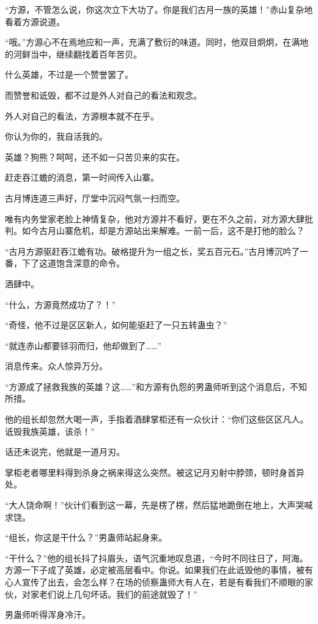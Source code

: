 \begin{this_body}
“方源，不管怎么说，你这次立下大功了。你是我们古月一族的英雄！”赤山复杂地看着方源说道。

“哦。”方源心不在焉地应和一声，充满了敷衍的味道。同时，他双目炯炯，在满地的河鲜当中，继续翻找着百年苦贝。

什么英雄，不过是一个赞誉罢了。

而赞誉和诋毁，都不过是外人对自己的看法和观念。

外人对自己的看法，方源根本就不在乎。

你认为你的，我自活我的。

英雄？狗熊？呵呵，还不如一只苦贝来的实在。

赶走吞江蟾的消息，第一时间传入山寨。

古月博连道三声好，厅堂中沉闷气氛一扫而空。

唯有内务堂家老脸上神情复杂，他对方源并不看好，更在不久之前，对方源大肆批判。如今古月山寨危机，却是方源站出来解难。一前一后，这不是打他的脸么？

“古月方源驱赶吞江蟾有功。破格提升为一组之长，奖五百元石。”古月博沉吟了一番，下了这道饱含深意的命令。

酒肆中。

“什么，方源竟然成功了？！”

“奇怪，他不过是区区新人，如何能驱赶了一只五转蛊虫？”

“就连赤山都要铩羽而归，他却做到了……”

消息传来。众人惊异万分。

“方源成了拯救我族的英雄？这……”和方源有仇怨的男蛊师听到这个消息后，不知所措。

他的组长却忽然大喝一声，手指着酒肆掌柜还有一众伙计：“你们这些区区凡人。诋毁我族英雄，该杀！”

话还未说完，他就是一道月刃。

掌柜老者哪里料得到杀身之祸来得这么突然。被这记月刃射中脖颈，顿时身首异处。

“大人饶命啊！”伙计们看到这一幕，先是楞了楞，然后猛地跪倒在地上，大声哭喊求饶。

“组长，你这是干什么？”男蛊师站起身来。

“干什么？”他的组长抖了抖眉头，语气沉重地叹息道，“今时不同往日了，阿海。方源一下子成了英雄，必定被高层看中。你说。如果我们在此诋毁他的事情，被有心人宣传了出去，会怎么样？在场的侦察蛊师大有人在，若是有看我们不顺眼的家伙，对家老们说上几句坏话。我们的前途就毁了！”

男蛊师听得浑身冷汗。


\end{this_body}
